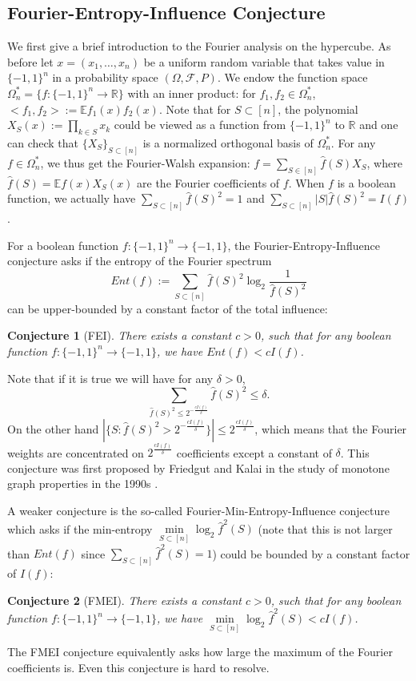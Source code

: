 \documentclass[10pt]{article} \usepackage[utf8]{inputenc}
\newtheorem{conj}{Conjecture}[section]
\theoremstyle{definition}
\theoremstyle{remark}
\numberwithin{equation}{section}
\begin{document}
\subsection{Fourier-Entropy-Influence Conjecture}
We first give a brief introduction to the Fourier analysis on the hypercube. As before let $x=(x_1,\dots,x_n)$ be a uniform random variable that takes value in $\{-1,1\}^n$ in a probability space $(\Omega, \mathcal{F}, P)$. We endow the function space $\Omega_n^*=\{f:\{-1,1\}^n \to \mathbb{R}\}$ with an inner product: for $f_1, f_2 \in \Omega_n^*$, $<f_1, f_2>:=\mathbb{E}f_1(x)f_2(x)$. Note that for $S\subset [n]$, the polynomial $X_S(x):=\prod\limits_{k\in S}x_k$ could be viewed as a function from $\{-1,1\}^n$ to $\mathbb{R}$ and one can check that $\{X_S\}_{S\subset [n]}$ is a normalized orthogonal basis of $\Omega_n^*$. For any $f\in \Omega_n^*$, we thus get the Fourier-Walsh expansion: $f=\sum\limits_{S\in[n]} \hat{f}(S)X_S$, where $\hat{f}(S)=\mathbb{E}f(x)X_S(x)$ are the Fourier coefficients of $f$. When $f$ is a boolean function, we actually have $\sum\limits_{S\subset[n]}\hat{f}(S)^2=1$ and $\sum\limits_{S\subset[n]}|S|\hat{f}(S)^2=I(f)$.

For a boolean function $f:\{-1, 1\}^n \to \{-1, 1\}$, the Fourier-Entropy-Influence conjecture asks if the entropy of the Fourier spectrum 
\begin{equation}
Ent(f):=\sum\limits_{S\subset [n]}\hat{f}(S)^2\log_2 \frac{1}{\hat{f}(S)^2}
\end{equation}
can be upper-bounded by a constant factor of the total influence:
\begin{conj}[FEI]
There exists a constant $c>0$, such that for any boolean function $f:\{-1,1\}^n \to \{-1,1\}$, we have $Ent(f)<cI(f)$.
\end{conj}
Note that if it is true we will have for any $\delta>0$, 
\begin{equation}
    \sum_{\hat{f}(S)^2\leq 2^{-\frac{cI(f)}{\delta}}}\hat{f}(S)^2\leq \delta.
\end{equation}
On the other hand $|\{S:\hat{f}(S)^2> 2^{-\frac{cI(f)}{\delta}}\}|\leq 2^{\frac{cI(f)}{\delta}}$, which means that the Fourier weights are concentrated on $2^{\frac{cI(f)}{\delta}}$ coefficients except a constant of $\delta$. This conjecture was first proposed by Friedgut and Kalai in the study of monotone graph properties in the 1990s \cite{10}.

A weaker conjecture is the so-called Fourier-Min-Entropy-Influence conjecture which asks if the min-entropy $\min\limits_{S\subset [n]} \log_2{\hat{f}^2(S)}$ (note that this is not larger than $Ent(f)$ since $\sum\limits_{S\subset [n]} \hat{f}^2(S)=1$) could be bounded by a constant factor of $I(f)$:
\begin{conj}[FMEI]
There exists a constant $c>0$, such that for any boolean function $f:\{-1,1\}^n \to \{-1,1\}$, we have $\min\limits_{S\subset [n]} \log_2{\hat{f}^2(S)}<cI(f)$.
\end{conj}
The FMEI conjecture equivalently asks how large the maximum of the Fourier coefficients is. Even this conjecture is hard to resolve.
\end{document}
